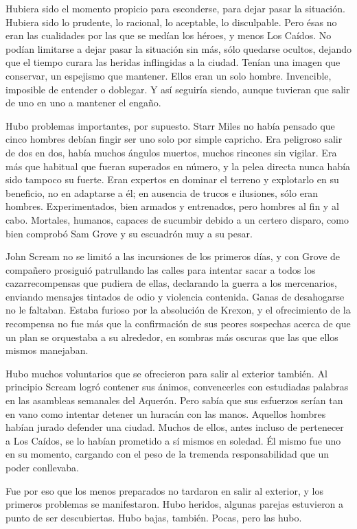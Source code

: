 Hubiera sido el momento propicio para esconderse, para dejar pasar la situación. Hubiera sido lo prudente, lo racional, lo aceptable, lo disculpable. Pero ésas no eran las cualidades por las que se medían los héroes, y menos Los Caídos. No podían limitarse a dejar pasar la situación sin más, sólo quedarse ocultos, dejando que el tiempo curara las heridas inflingidas a la ciudad. Tenían una imagen que conservar, un espejismo que mantener. Ellos eran un solo hombre. Invencible, imposible de entender o doblegar. Y así seguiría siendo, aunque tuvieran que salir de uno en uno a mantener el engaño.

Hubo problemas importantes, por supuesto. Starr Miles no había pensado que cinco hombres debían fingir ser uno solo por simple capricho. Era peligroso salir de dos en dos, había muchos ángulos muertos, muchos rincones sin vigilar. Era más que habitual que fueran superados en número, y la pelea directa nunca había sido tampoco su fuerte. Eran expertos en dominar el terreno y explotarlo en su beneficio, no en adaptarse a él; en ausencia de trucos e ilusiones, sólo eran hombres. Experimentados, bien armados y entrenados, pero hombres al fin y al cabo. Mortales, humanos, capaces de sucumbir debido a un certero disparo, como bien comprobó Sam Grove y su escuadrón muy a su pesar.

John Scream no se limitó a las incursiones de los primeros días, y con Grove de compañero prosiguió patrullando las calles para intentar sacar a todos los cazarrecompensas que pudiera de ellas, declarando la guerra a los mercenarios, enviando mensajes tintados de odio y violencia contenida. Ganas de desahogarse no le faltaban. Estaba furioso por la absolución de Krexon, y el ofrecimiento de la recompensa no fue más que la confirmación de sus peores sospechas acerca de que un plan se orquestaba a su alrededor, en sombras más oscuras que las que ellos mismos manejaban.

Hubo muchos voluntarios que se ofrecieron para salir al exterior también. Al principio Scream logró contener sus ánimos, convencerles con estudiadas palabras en las asambleas semanales del Aquerón. Pero sabía que sus esfuerzos serían tan en vano como intentar detener un huracán con las manos. Aquellos hombres habían jurado defender una ciudad. Muchos de ellos, antes incluso de pertenecer a Los Caídos, se lo habían prometido a sí mismos en soledad. Él mismo fue uno en su momento, cargando con el peso de la tremenda responsabilidad que un poder conllevaba.

Fue por eso que los menos preparados no tardaron en salir al exterior, y los primeros problemas se manifestaron. Hubo heridos, algunas parejas estuvieron a punto de ser descubiertas. Hubo bajas, también. Pocas, pero las hubo.

